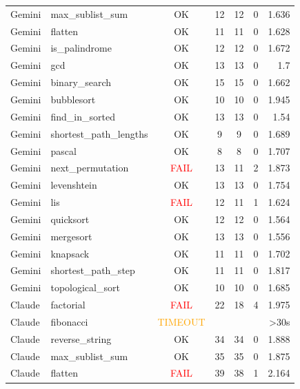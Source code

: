 \begin{longtable}{l l c c c c r}
  Gemini & max\_sublist\_sum & \textcolor{green!60!black}{OK} & 12 & 12 & 0 & 1.636 \\
  Gemini & flatten & \textcolor{green!60!black}{OK} & 11 & 11 & 0 & 1.628 \\
  Gemini & is\_palindrome & \textcolor{green!60!black}{OK} & 12 & 12 & 0 & 1.672 \\
  Gemini & gcd & \textcolor{green!60!black}{OK} & 13 & 13 & 0 & 1.7 \\
  Gemini & binary\_search & \textcolor{green!60!black}{OK} & 15 & 15 & 0 & 1.662 \\
  Gemini & bubblesort & \textcolor{green!60!black}{OK} & 10 & 10 & 0 & 1.945 \\
  Gemini & find\_in\_sorted & \textcolor{green!60!black}{OK} & 13 & 13 & 0 & 1.54 \\
  Gemini & shortest\_path\_lengths & \textcolor{green!60!black}{OK} & 9 & 9 & 0 & 1.689 \\
  Gemini & pascal & \textcolor{green!60!black}{OK} & 8 & 8 & 0 & 1.707 \\
  Gemini & next\_permutation & \textcolor{red}{FAIL} & 13 & 11 & 2 & 1.873 \\
  Gemini & levenshtein & \textcolor{green!60!black}{OK} & 13 & 13 & 0 & 1.754 \\
  Gemini & lis & \textcolor{red}{FAIL} & 12 & 11 & 1 & 1.624 \\
  Gemini & quicksort & \textcolor{green!60!black}{OK} & 12 & 12 & 0 & 1.564 \\
  Gemini & mergesort & \textcolor{green!60!black}{OK} & 13 & 13 & 0 & 1.556 \\
  Gemini & knapsack & \textcolor{green!60!black}{OK} & 11 & 11 & 0 & 1.702 \\
  Gemini & shortest\_path\_step & \textcolor{green!60!black}{OK} & 11 & 11 & 0 & 1.817 \\
  Gemini & topological\_sort & \textcolor{green!60!black}{OK} & 10 & 10 & 0 & 1.685 \\
  \midrule
  Claude & factorial & \textcolor{red}{FAIL} & 22 & 18 & 4 & 1.975 \\
  Claude & fibonacci & \textcolor{orange}{TIMEOUT} &  &  &  & >30s \\
  Claude & reverse\_string & \textcolor{green!60!black}{OK} & 34 & 34 & 0 & 1.888 \\
  Claude & max\_sublist\_sum & \textcolor{green!60!black}{OK} & 35 & 35 & 0 & 1.875 \\
  Claude & flatten & \textcolor{red}{FAIL} & 39 & 38 & 1 & 2.164 \\

\end{longtable}

